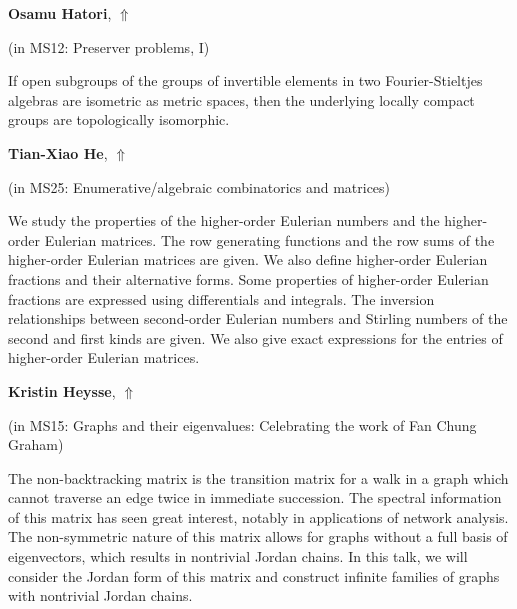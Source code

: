 \documentclass[ILAS2025-program.tex]{subfiles}
\begin{document}
\hypertarget{down0128}{}\begin{ilasabstract}
    
\textbf{Osamu Hatori},  \hfill \hyperlink{up0128}{$\Uparrow$}
    
    
(in {\color{mstitle}MS12: Preserver problems, I})
        
\mtskip
    If open subgroups of the groups of invertible elements in two Fourier-Stieltjes algebras are isometric as metric spaces, then the underlying locally compact groups are topologically isomorphic.

\end{ilasabstract}
    

\hypertarget{down0183}{}\begin{ilasabstract}
    
\textbf{Tian-Xiao He},  \hfill \hyperlink{up0183}{$\Uparrow$}
    
    
(in {\color{mstitle}MS25: Enumerative/algebraic combinatorics and matrices})
        
\mtskip
    We study the properties of the higher-order Eulerian numbers and the higher-order Eulerian matrices. The row generating functions and the row sums of the higher-order Eulerian matrices are given. We also define higher-order Eulerian fractions and their alternative forms. Some properties of higher-order Eulerian fractions are expressed using differentials and integrals. The inversion relationships between second-order Eulerian numbers and Stirling numbers of the second and first kinds are given. We also give exact expressions for the entries of higher-order Eulerian matrices.
\end{ilasabstract}
    

\hypertarget{down0062}{}\begin{ilasabstract}
    
\textbf{Kristin Heysse},  \hfill \hyperlink{up0062}{$\Uparrow$}
    
    
(in {\color{mstitle}MS15: Graphs and their eigenvalues: Celebrating the work of Fan Chung Graham})
        
\mtskip
    The non-backtracking matrix is the transition matrix for a walk in a graph which cannot traverse an edge twice in immediate succession. The spectral information of this matrix has seen great interest, notably in applications of network analysis. The non-symmetric nature of this matrix allows for graphs without a full basis of eigenvectors, which results in nontrivial Jordan chains. In this talk, we will consider the Jordan form of this matrix and construct infinite families of graphs with nontrivial Jordan chains. 

\end{ilasabstract}
    
\end{document}
